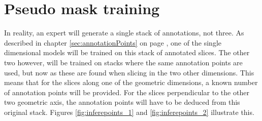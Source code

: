 \chapter{Pseudo mask training}
\par{
    In reality, an expert will generate a single stack of annotations, not three.
    As described in chapter \ref{sec:annotationPoints} on page \pageref{sec:annotationPoints}, one of the single dimensional models will be trained on this stack of annotated slices.
    The other two however, will be trained on stacks where the same annotation points are used, but now as these are found when slicing in the two other dimensions.
    This means that for the slices along one of the geometric dimensions, a known number of annotation points will be provided.
    For the slices perpendicular to the other two geometric axis, the annotation points will have to be deduced from this original stack.
    Figures \ref{fig:inferepoints_1} and \ref{fig:inferepoints_2} illustrate this.
}

